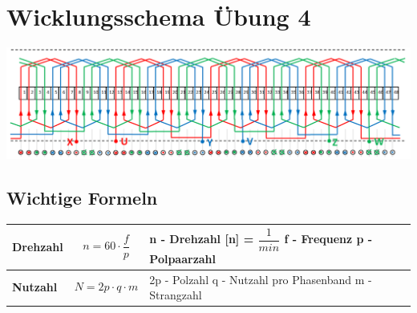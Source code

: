 \section{Wicklungsschema Übung 4}
\includegraphics[scale = 0.5]{images/Wicklungsschema}
\subsection{Wichtige Formeln}
\begin{tabular}{|C{0.3\textwidth}|P{0.4\textwidth}|P{0.3\textwidth}}
	\hline
	\textbf{Drehzahl} & \[n = 60\cdot \dfrac{f}{p}\] & \vspace{0.05cm}n - Drehzahl [n] = $\dfrac{1}{min}$ \newline 
													   f - Frequenz \newline
													   p - Polpaarzahl 
\\ \hline
	\textbf{Nutzahl} & \[ N = 2p\cdot q\cdot m\] & 2p - Polzahl \newline 
												   q - Nutzahl pro Phasenband \newline
												   m - Strangzahl 
\\ \hline						 
\end{tabular}

